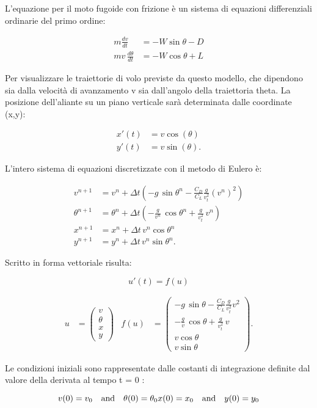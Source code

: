 L’equazione per il moto fugoide con frizione è un sistema di equazioni differenziali ordinarie del primo ordine: 

\begin{align}
m \frac{dv}{dt} & = - W \sin\theta - D \\
m v \, \frac{d\theta}{dt} & = - W \cos\theta + L
\end{align}

Per visualizzare le traiettorie di volo previste da questo modello, che dipendono sia dalla velocità di avanzamento v sia dall’angolo della traiettoria theta. La posizione dell’aliante su un piano verticale sarà determinata dalle coordinate (x,y): 

\begin{align}
x'(t) & = v \cos(\theta) \\
y'(t) & = v \sin(\theta).
\end{align}


L’intero sistema di equazioni discretizzate con il metodo di Eulero è:

\begin{align}
v^{n+1} & = v^n + \Delta t \left(- g\, \sin\theta^n - \frac{C_D}{C_L} \frac{g}{v_t^2} (v^n)^2 \right) \\
\theta^{n+1} & = \theta^n + \Delta t \left(- \frac{g}{v^n}\,\cos\theta^n + \frac{g}{v_t^2}\, v^n \right) \\
x^{n+1} & = x^n + \Delta t \, v^n \cos\theta^n \\
y^{n+1} & = y^n + \Delta t \, v^n \sin\theta^n.
\end{align}

Scritto in forma vettoriale risulta: 

$$u'(t) = f(u)$$

\begin{align}
u & = \begin{pmatrix} v \\ \theta \\ x \\ y \end{pmatrix} & f(u) & = \begin{pmatrix} - g\, \sin\theta - \frac{C_D}{C_L} \frac{g}{v_t^2} v^2 \\ - \frac{g}{v}\,\cos\theta + \frac{g}{v_t^2}\, v \\ v\cos\theta \\ v\sin\theta \end{pmatrix}.
\end{align}

Le condizioni iniziali sono rappresentate dalle costanti di integrazione definite dal valore della derivata al tempo t = 0 :

$$
v(0) = v_0 \quad \text{and} \quad \theta(0) = \theta_0\\
x(0) = x_0 \quad \text{and} \quad y(0) = y_0
$$

